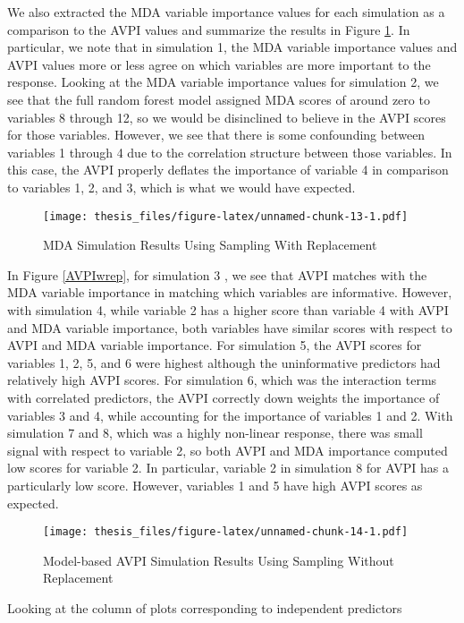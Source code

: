 \documentclass[12pt,twoside]{reedthesis}
\theoremstyle{definition}
\theoremstyle{definition}
\theoremstyle{definition}
\theoremstyle{remark}
\begin{document}
We also extracted the MDA variable importance values for each simulation
as a comparison to the AVPI values and summarize the results in Figure
\ref{MDAwrep}. In particular, we note that in simulation 1, the MDA
variable importance values and AVPI values more or less agree on which
variables are more important to the response. Looking at the MDA
variable importance values for simulation 2, we see that the full random
forest model assigned MDA scores of around zero to variables 8 through
12, so we would be disinclined to believe in the AVPI scores for those
variables. However, we see that there is some confounding between
variables 1 through 4 due to the correlation structure between those
variables. In this case, the AVPI properly deflates the importance of
variable 4 in comparison to variables 1, 2, and 3, which is what we
would have expected. \par
\begin{figure}
\centering
\texttt{[image: thesis\_files/figure-latex/unnamed-chunk-13-1.pdf]}
\caption{\label{fig:unnamed-chunk-13}\label{MDAwrep}MDA Simulation Results
Using Sampling With Replacement}
\end{figure}
In Figure \ref{AVPIwrep}, for simulation 3 , we see that AVPI matches
with the MDA variable importance in matching which variables are
informative. However, with simulation 4, while variable 2 has a higher
score than variable 4 with AVPI and MDA variable importance, both
variables have similar scores with respect to AVPI and MDA variable
importance. For simulation 5, the AVPI scores for variables 1, 2, 5, and
6 were highest although the uninformative predictors had relatively high
AVPI scores. For simulation 6, which was the interaction terms with
correlated predictors, the AVPI correctly down weights the importance of
variables 3 and 4, while accounting for the importance of variables 1
and 2. With simulation 7 and 8, which was a highly non-linear response,
there was small signal with respect to variable 2, so both AVPI and MDA
importance computed low scores for variable 2. In particular, variable 2
in simulation 8 for AVPI has a particularly low score. However,
variables 1 and 5 have high AVPI scores as expected. \par 
\begin{figure}
\centering
\texttt{[image: thesis\_files/figure-latex/unnamed-chunk-14-1.pdf]}
\caption{\label{fig:unnamed-chunk-14}\label{AVPIworep}Model-based AVPI
Simulation Results Using Sampling Without Replacement}
\end{figure}
Looking at the column of plots corresponding to independent predictors
\end{document}
